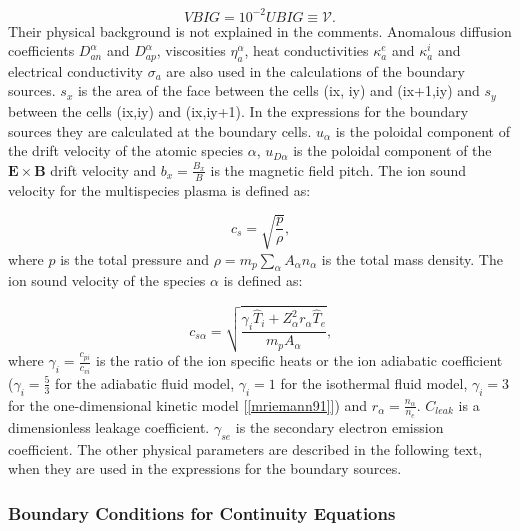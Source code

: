 \documentclass[11pt]{article}
\begin{document}
\begin{equation}
VBIG=10^{-2}UBIG\equiv\mathcal{V}\text{.}   \label{c5}
\end{equation}
Their physical background is not explained in the comments. Anomalous
diffusion coefficients $D_{an}^{\alpha}$ and $D_{ap}^{\alpha}$, viscosities $%
\eta_{a}^{\alpha}$, heat conductivities $\kappa_{a}^{e}$ and $\kappa_{a}^{i}$
and electrical conductivity $\sigma_{a}$ are also used in the calculations
of the boundary sources. $s_{x}$ is the area of the face between the cells
(ix, iy) and (ix+1,iy) and $s_{y}$ between the cells (ix,iy) and (ix,iy+1).
In the expressions for the boundary sources they are calculated at the
boundary cells. $u_{\alpha}$ is the poloidal component of the drift velocity
of the atomic species $\alpha$, $u_{D\alpha}$ is the poloidal component of
the $\mathbf{E\times B}$ drift velocity and $b_{x}=\frac{B_{x}}{B}$ is the
magnetic field pitch. The ion sound velocity for the multispecies plasma is
defined as:

\begin{equation}
c_{s}=\sqrt{\frac{p}{\rho}}\text{,}   \label{c6}
\end{equation}
where $p$ is the total pressure and $\rho=m_{p}\sum_{\alpha}A_{\alpha
}n_{\alpha}$ is the total mass density. The ion sound velocity of the
species $\alpha$ is defined as:

\begin{equation}
c_{s\alpha}=\sqrt{\frac{\gamma_{i}\widehat{T}_{i}+Z_{\alpha}^{2}r_{\alpha }%
\widehat{T}_{e}}{m_{p}A_{\alpha}}}\text{,}   \label{c7}
\end{equation}
where $\gamma_{i}=\frac{c_{pi}}{c_{vi}}$ is the ratio of the ion specific
heats or the ion adiabatic coefficient ($\gamma_{i}=\frac{5}{3}$ for the
adiabatic fluid model, $\gamma_{i}=1$ for the isothermal fluid model, $%
\gamma_{i}=3$ for the one-dimensional kinetic model [\ref{mriemann91}]) and $%
r_{\alpha}=\frac{n_{\alpha}}{n_{e}}$. $C_{leak}$ is a dimensionless leakage
coefficient. $\gamma_{se}$ is the secondary electron emission coefficient.
The other physical parameters are described in the following text, when they
are used in the expressions for the boundary sources.

\bigskip

\subsubsection{Boundary Conditions for Continuity Equations}
\end{document}
